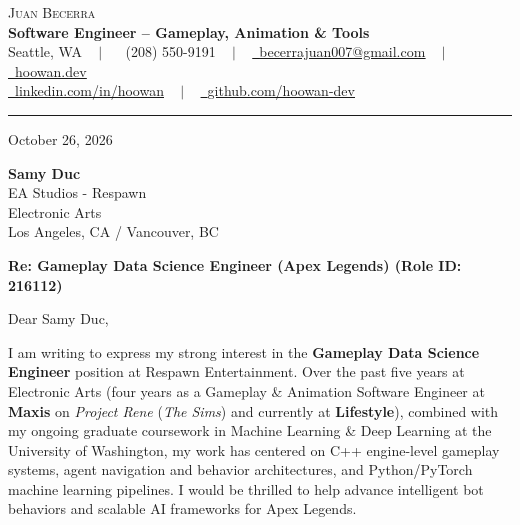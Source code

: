 \documentclass[letterpaper,11pt]{article}
\begin{document}
\begin{center}
    {\Huge \scshape Juan Becerra} \\ \vspace{4pt}
    \textbf{\large Software Engineer -- Gameplay, Animation \& Tools} \\ \vspace{4pt}
    \small Seattle, WA ~ $|$ ~
    \raisebox{-0.1\height}\faPhone\ (208) 550-9191 ~ $|$ ~
    \href{mailto:becerrajuan007@gmail.com}{\raisebox{-0.2\height}\faEnvelope\ \underline{becerrajuan007@gmail.com}} ~ $|$ ~
    \href{https://hoowan.dev}{\raisebox{-0.2\height}\faGlobe\ \underline{hoowan.dev}} \\ \vspace{2pt}
    \href{https://linkedin.com/in/hoowan/}{\raisebox{-0.2\height}\faLinkedin\ \underline{linkedin.com/in/hoowan}} ~ $|$ ~
    \href{https://github.com/hoowan-dev}{\raisebox{-0.2\height}\faGithub\ \underline{github.com/hoowan-dev}}
\end{center}

\vspace{4pt}
\hrule
\vspace{14pt}

\noindent October 26, 2026

\vspace{8pt}
\noindent \textbf{Samy Duc} \\
EA Studios - Respawn \\
Electronic Arts \\
Los Angeles, CA / Vancouver, BC

\vspace{8pt}
\noindent \textbf{Re: Gameplay Data Science Engineer (Apex Legends) (Role ID: 216112)}

\vspace{8pt}
\noindent Dear Samy Duc,

I am writing to express my strong interest in the \textbf{Gameplay Data Science Engineer} 
position at Respawn Entertainment. Over the past five years at Electronic Arts (four years as a 
Gameplay \& Animation Software Engineer at \textbf{Maxis} on \emph{Project Rene} (\emph{The Sims}) 
and currently at \textbf{Lifestyle}), combined with my ongoing graduate coursework in Machine 
Learning \& Deep Learning at the University of Washington, my work has centered on C++ 
engine-level gameplay systems, agent navigation and behavior architectures, and Python/PyTorch 
machine learning pipelines. I would be thrilled to help advance intelligent bot behaviors and 
scalable AI frameworks for Apex Legends.
\end{document}
